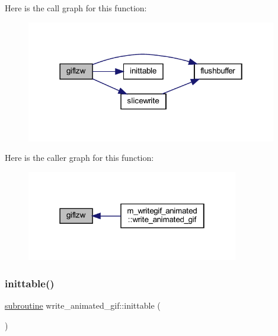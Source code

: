 Here is the call graph for this function\+:
\nopagebreak
\begin{figure}[H]
\begin{center}
\leavevmode
\includegraphics[width=310pt]{M__writegif__animated_8f90_aa30b256c6cb90f13a18e32768d35696b_cgraph}
\end{center}
\end{figure}
Here is the caller graph for this function\+:
\nopagebreak
\begin{figure}[H]
\begin{center}
\leavevmode
\includegraphics[width=262pt]{M__writegif__animated_8f90_aa30b256c6cb90f13a18e32768d35696b_icgraph}
\end{center}
\end{figure}
\mbox{\label{M__writegif__animated_8f90_acd7274fbac8690a12be91b542378a4eb}} 
\subsubsection{\texorpdfstring{inittable()}{inittable()}}
{\footnotesize\ttfamily \hyperlink{M__stopwatch_83_8txt_acfbcff50169d691ff02d4a123ed70482}{subroutine} write\+\_\+animated\+\_\+gif\+::inittable (\begin{DoxyParamCaption}{ }\end{DoxyParamCaption})\hspace{0.3cm}{\ttfamily [private]}}



